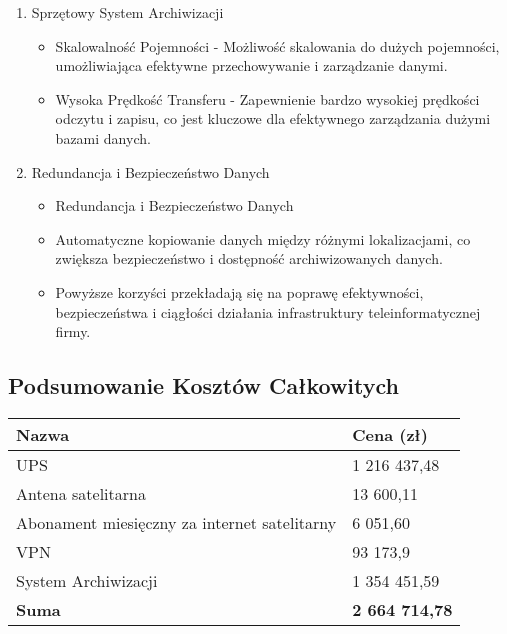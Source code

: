 \begin{enumerate}
        \item Sprzętowy System Archiwizacji
        \begin{itemize}
            \item Skalowalność Pojemności - Możliwość skalowania do dużych pojemności, umożliwiająca efektywne przechowywanie i
            zarządzanie danymi.
            \item Wysoka Prędkość Transferu - Zapewnienie bardzo wysokiej prędkości odczytu i zapisu, co jest kluczowe dla efektywnego
            zarządzania dużymi bazami danych.
        \end{itemize}


        \item Redundancja i Bezpieczeństwo Danych
        \begin{itemize}
            \item Redundancja i Bezpieczeństwo Danych
            \item Automatyczne kopiowanie danych między różnymi lokalizacjami, co zwiększa bezpieczeństwo i
            dostępność archiwizowanych danych.
            \item Powyższe korzyści przekładają się na poprawę efektywności, bezpieczeństwa i ciągłości działania
            infrastruktury teleinformatycznej firmy.
        \end{itemize}



    \end{enumerate}


\subsection{Podsumowanie Kosztów Całkowitych}
    \begin{flushleft}
        \begin{table}[h]
            \renewcommand{\arraystretch}{1.5}
            \begin{tabular}{|l|l|}
                \hline
                \textbf{Nazwa} & \textbf{Cena (zł)} \\
                \hline
                UPS & 1 216 437,48 \\
                Antena satelitarna & 13 600,11 \\
                Abonament miesięczny za internet satelitarny & 6 051,60 \\
                VPN & 93 173,9 \\
                System Archiwizacji & 1 354 451,59 \\
                \hline
                \textbf{Suma} & \textbf{2 664 714,78} \\
                \hline
            \end{tabular}
        \end{table}
    \end{flushleft}